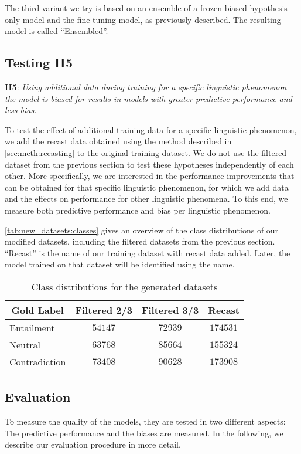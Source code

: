 The third variant we try is based on an ensemble of a frozen biased hypothesis-only model and the fine-tuning model, as previously described. The resulting model is called \enquote{Ensembled}.

\subsection{Testing H5}
\textbf{H5}: \textit{Using additional data during training for a specific linguistic phenomenon the model is biased for results in models with greater predictive performance and less bias.}

To test the effect of additional training data for a specific linguistic phenomenon, we add the recast data obtained using the method described in \autoref{sec:meth:recasting} to the original training dataset. We do not use the filtered dataset from the previous section to test these hypotheses independently of each other. More specifically, we are interested in the performance improvements that can be obtained for that specific linguistic phenomenon, for which we add data and the effects on performance for other linguistic phenomena. To this end, we measure both predictive performance and bias per linguistic phenomenon.

\autoref{tab:new_datasets:classes} gives an overview of the class distributions of our modified datasets, including the filtered datasets from the previous section. \enquote{Recast} is the name of our training dataset with recast data added. Later, the model trained on that dataset will be identified using the name.

\begin{table}[ht]
    \centering
    \caption{Class distributions for the generated datasets}
    \small
    \begin{tabular}{l c c c}
        \toprule
        \multicolumn{1}{c}{Gold Label} &  Filtered 2/3 & Filtered 3/3 & Recast \\
        \midrule
        Entailment & $54147$ & $72939$ & $174531$ \\
        Neutral & $63768$ & $85664$ & $155324$ \\
        Contradiction & $73408$ & $90628$ & $173908$ \\
        \bottomrule
    \end{tabular}
    \label{tab:new_datasets:classes}
\end{table}

\subsection{Evaluation}
To measure the quality of the models, they are tested in two different aspects: The predictive performance and the biases are measured. In the following, we describe our evaluation procedure in more detail.

